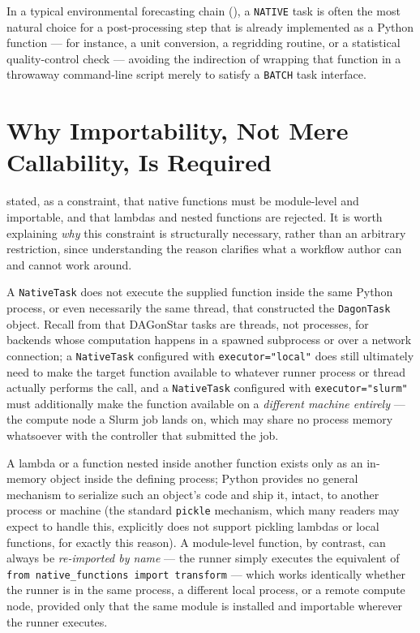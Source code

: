 In a typical environmental forecasting chain (), a
\texttt{NATIVE} task is often the most natural choice for a post-processing
step that is already implemented as a Python function --- for instance, a
unit conversion, a regridding routine, or a statistical quality-control
check --- avoiding the indirection of wrapping that function in a throwaway
command-line script merely to satisfy a \texttt{BATCH} task interface.

\section{Why Importability, Not Mere Callability, Is Required}

 stated, as a constraint, that native functions must
be module-level and importable, and that lambdas and nested functions are
rejected. It is worth explaining \emph{why} this constraint is structurally
necessary, rather than an arbitrary restriction, since understanding the
reason clarifies what a workflow author can and cannot work around.

A \texttt{NativeTask} does not execute the supplied function inside the same
Python process, or even necessarily the same thread, that constructed the
\texttt{DagonTask} object. Recall from  that
DAGonStar tasks are threads, not processes, for backends whose computation
happens in a spawned subprocess or over a network connection; a
\texttt{NativeTask} configured with \texttt{executor="local"} does still
ultimately need to make the target function available to whatever runner
process or thread actually performs the call, and a \texttt{NativeTask}
configured with \texttt{executor="slurm"} must additionally make the
function available on a \emph{different machine entirely} --- the compute
node a Slurm job lands on, which may share no process memory whatsoever
with the controller that submitted the job.

A lambda or a function nested inside another function exists only as an
in-memory object inside the defining process; Python provides no general
mechanism to serialize such an object's code and ship it, intact, to another
process or machine (the standard \texttt{pickle} mechanism, which many
readers may expect to handle this, explicitly does not support pickling
lambdas or local functions, for exactly this reason). A module-level
function, by contrast, can always be \emph{re-imported by name} --- the
runner simply executes the equivalent of \texttt{from native\_functions
import transform} --- which works identically whether the runner is in the
same process, a different local process, or a remote compute node, provided
only that the same module is installed and importable wherever the runner
executes.

